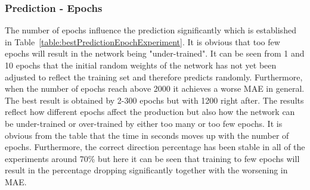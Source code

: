 \subsubsection{Prediction - Epochs}
The number of epochs influence the prediction significantly which is established in Table~\ref{table:bestPredictionEpochExperiment}. It is obvious that too few epochs will result in the network being "under-trained". It can be seen from 1 and 10 epochs that the initial random weights of the network has not yet been adjusted to reflect the training set and therefore predicts randomly. Furthermore, when the number of epochs reach above 2000 it achieves a worse MAE in general. The best result is obtained by 2-300 epochs but with 1200 right after. The results reflect how different epochs affect the production but also how the network can be under-trained or over-trained by either too many or too few epochs. It is obvious from the table that the time in seconds moves up with the number of epochs. Furthermore, the correct direction percentage has been stable in all of the experiments around 70\% but here it can be seen that training to few epochs will result in the percentage dropping significantly together with the worsening in MAE.


